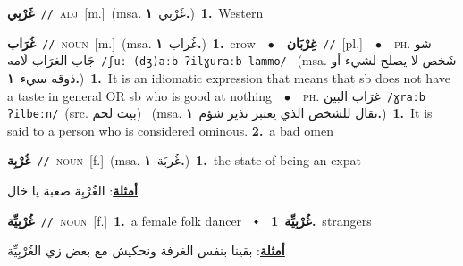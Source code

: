 \documentclass[10pt,a4paper,twoside]{article} %
\begin{document}
\begin{multicols}{2}
{\setlength\topsep{0pt}\textbf{\foreignlanguage{arabic}{غَرْبِي}}\ {\color{gray}\texttt{//}\color{black}}\ \textsc{adj}\ [m.]\ \color{gray}(msa. \foreignlanguage{arabic}{غَرْبِي}~\foreignlanguage{arabic}{\textbf{١.}})\color{black}\ \textbf{1.}~Western\ } \vspace{2mm}

{\setlength\topsep{0pt}\textbf{\foreignlanguage{arabic}{غُرَاب}}\ {\color{gray}\texttt{//}\color{black}}\ \textsc{noun}\ [m.]\ \color{gray}(msa. \foreignlanguage{arabic}{غُراب}~\foreignlanguage{arabic}{\textbf{١.}})\color{black}\ \textbf{1.}~crow\ \ $\bullet$\ \ \setlength\topsep{0pt}\textbf{\foreignlanguage{arabic}{غِرْبَان}}\ {\color{gray}\texttt{//}\color{black}}\ [pl.]\ \ $\bullet$\ \ \textsc{ph.} \color{gray} \foreignlanguage{arabic}{شو جَاب الغرَاب لَامه}\color{black}\ {\color{gray}\texttt{/{\sffamily ʃuː (dʒ)aːb ʔilɣuraːb lammo}/}\color{black}}\ \color{gray} (msa. \foreignlanguage{arabic}{شَخص لا يصلح لشيء أو ذوقه سيء}~\foreignlanguage{arabic}{\textbf{١.}})\color{black}\ \textbf{1.}~It is an idiomatic expression that means that sb does not have a taste in general OR sb who is good at nothing\ \ $\bullet$\ \ \textsc{ph.} \color{gray} \foreignlanguage{arabic}{غرَاب البين}\color{black}\ {\color{gray}\texttt{/{\sffamily ɣraːb ʔilbeːn}/}\color{black}}\ \color{gray}(src. \foreignlanguage{arabic}{بيت لحم})\color{black}\ \color{gray} (msa. \foreignlanguage{arabic}{تقال للشخص الذي يعتبر نذير شؤم}~\foreignlanguage{arabic}{\textbf{١.}})\color{black}\ \textbf{1.}~It is said to a person who is considered ominous.  \textbf{2.}~a bad omen\ } \vspace{2mm}

{\setlength\topsep{0pt}\textbf{\foreignlanguage{arabic}{غُرْبِة}}\ {\color{gray}\texttt{//}\color{black}}\ \textsc{noun}\ [f.]\ \color{gray}(msa. \foreignlanguage{arabic}{غُربَة}~\foreignlanguage{arabic}{\textbf{١.}})\color{black}\ \textbf{1.}~the state of being an expat\  \begin{flushright}\color{gray}\foreignlanguage{arabic}{\textbf{\underline{\foreignlanguage{arabic}{أمثلة}}}: الغُرْبِة صعبة يا خال}\end{flushright}\color{black}} \vspace{2mm}

{\setlength\topsep{0pt}\textbf{\foreignlanguage{arabic}{غُرْبِيِّة}}\ {\color{gray}\texttt{//}\color{black}}\ \textsc{noun}\ [f.]\ \textbf{1.}~a female folk dancer\ \ $\smblkdiamond$\ \ \setlength\topsep{0pt}\textbf{\foreignlanguage{arabic}{غُرْبِيِّة}}\ \textbf{1.}~strangers\  \begin{flushright}\color{gray}\foreignlanguage{arabic}{\textbf{\underline{\foreignlanguage{arabic}{أمثلة}}}: بقينا بنفس الغرفة ونحكيش مع بعض زي الغُرْبِيِّة}\end{flushright}\color{black}} \vspace{2mm}


\end{multicols}
\end{document}
